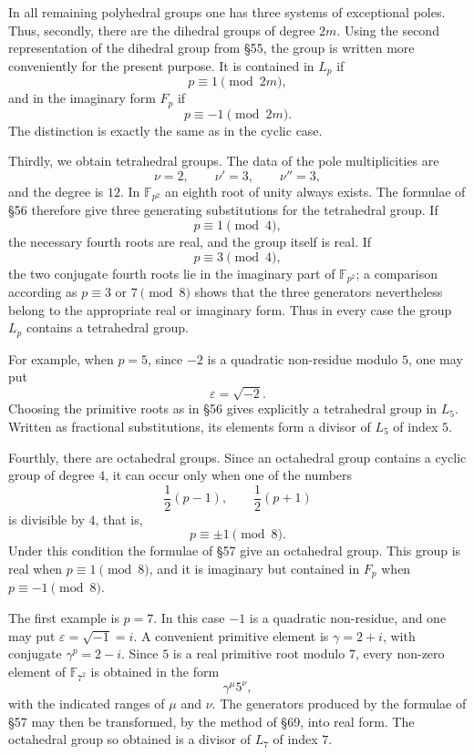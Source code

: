 \documentclass[11pt,a4paper]{book}
\newcommand{\F}{\mathbb F}
\begin{document}
In all remaining polyhedral groups one has three systems of exceptional poles.  Thus, secondly, there are the dihedral groups of degree \(2m\).  Using the second representation of the dihedral group from \S 55, the group is written more conveniently for the present purpose.  It is contained in \(L_p\) if
\[
 p\equiv 1\pmod {2m},
\]
and in the imaginary form \(F_p\) if
\[
 p\equiv -1\pmod {2m}.
\]
The distinction is exactly the same as in the cyclic case.

Thirdly, we obtain tetrahedral groups.  The data of the pole multiplicities are
\[
 \nu=2,\qquad \nu'=3,\qquad \nu''=3,
\]
and the degree is \(12\).  In \(\F_{p^2}\) an eighth root of unity always exists.  The formulae of \S 56 therefore give three generating substitutions for the tetrahedral group.  If
\[
 p\equiv 1\pmod 4,
\]
the necessary fourth roots are real, and the group itself is real.  If
\[
 p\equiv 3\pmod 4,
\]
the two conjugate fourth roots lie in the imaginary part of \(\F_{p^2}\); a comparison according as \(p\equiv 3\) or \(7\pmod 8\) shows that the three generators nevertheless belong to the appropriate real or imaginary form.  Thus in every case the group \(L_p\) contains a tetrahedral group.

For example, when \(p=5\), since \(-2\) is a quadratic non-residue modulo \(5\), one may put
\[
 \varepsilon=\sqrt{-2}.
\]
Choosing the primitive roots as in \S 56 gives explicitly a tetrahedral group in \(L_5\).  Written as fractional substitutions, its elements form a divisor of \(L_5\) of index \(5\).

Fourthly, there are octahedral groups.  Since an octahedral group contains a cyclic group of degree \(4\), it can occur only when one of the numbers
\[
 \frac12(p-1),\qquad \frac12(p+1)
\]
is divisible by \(4\), that is,
\[
 p\equiv \pm1\pmod 8 .
\]
Under this condition the formulae of \S 57 give an octahedral group.  This group is real when \(p\equiv 1\pmod8\), and it is imaginary but contained in \(F_p\) when \(p\equiv -1\pmod8\).

The first example is \(p=7\).  In this case \(-1\) is a quadratic non-residue, and one may put \(\varepsilon=\sqrt{-1}=i\).  A convenient primitive element is \(\gamma=2+i\), with conjugate \(\gamma^p=2-i\).  Since \(5\) is a real primitive root modulo \(7\), every non-zero element of \(\F_{7^2}\) is obtained in the form
\[
 \gamma^\mu 5^\nu ,
\]
with the indicated ranges of \(\mu\) and \(\nu\).  The generators produced by the formulae of \S 57 may then be transformed, by the method of \S 69, into real form.  The octahedral group so obtained is a divisor of \(L_7\) of index \(7\).
\end{document}
